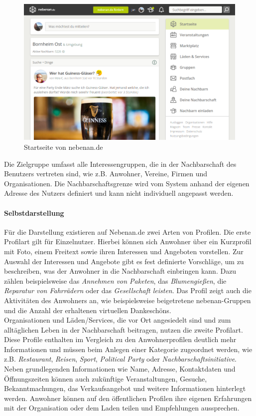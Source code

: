 \begin{figure}[!htb]
    \centering
    \includegraphics[width=\textwidth]{figures/jan/pic_nebenan.png}
    \caption[Startseite von nebenan.de]{Startseite von nebenan.de}
    \label{fig:nebenan}
\end{figure}

Die Zielgruppe umfasst alle Interessengruppen, die in der Nachbarschaft des Benutzers vertreten sind, wie z.B. Anwohner, Vereine, Firmen und Organisationen. Die Nachbarschaftsgrenze wird vom System anhand der eigenen Adresse des Nutzers definiert und kann nicht individuell angepasst werden.

\paragraph{Selbstdarstellung}

Für die Darstellung existieren auf Nebenan.de zwei Arten von Profilen. Die erste Profilart gilt für Einzelnutzer. Hierbei können sich Anwohner über ein Kurzprofil mit Foto, einem Freitext sowie ihren Interessen und Angeboten vorstellen. Zur Auswahl der Interessen und Angebote gibt es fest definierte Vorschläge, um zu beschreiben, was der Anwohner in die Nachbarschaft einbringen kann. Dazu zählen beispielsweise das \textit{Annehmen von Paketen}, das \textit{Blumengießen}, die \textit{Reparatur von Fahrrädern} oder das \textit{Gesellschaft leisten}. Das Profil zeigt auch die Aktivitäten des Anwohners an, wie beispielsweise beigetretene nebenan-Gruppen und die Anzahl der erhaltenen virtuellen Dankeschöns. \\
Organisationen und Läden/Services, die vor Ort angesiedelt sind und zum alltäglichen Leben in der Nachbarschaft beitragen, nutzen die zweite Profilart. Diese Profile enthalten im Vergleich zu den Anwohnerprofilen deutlich mehr Informationen und müssen beim Anlegen einer Kategorie zugeordnet werden, wie z.B. \textit{Restaurant}, \textit{Reisen}, \textit{Sport}, \textit{Political Party} oder \textit{Nachbarschaftsinitiative}. Neben grundlegenden Informationen wie Name, Adresse, Kontaktdaten und Öffnungszeiten können auch zukünftige Veranstaltungen, Gesuche, Bekanntmachungen, das Verkaufsangebot und weitere Informationen hinterlegt werden. Anwohner können auf den öffentlichen Profilen ihre eigenen Erfahrungen mit der Organisation oder dem Laden teilen und Empfehlungen aussprechen.


